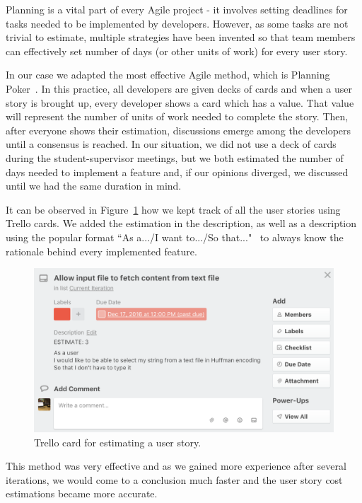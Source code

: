 \documentclass{l4proj}
\begin{document}
Planning is a vital part of every Agile project - it involves setting deadlines for tasks needed to be implemented by
developers. However, as some tasks are not trivial to estimate, multiple strategies have been invented so that team
members can effectively set number of days (or other units of work) for every user story.

In our case we adapted the most effective Agile method, which is
Planning Poker~\cite{planning-poker}. In this practice, all developers are given decks of cards and when a user story is brought up, every developer shows a card which has a value. That value will represent the number of units of work
needed to complete the story. Then, after everyone shows their estimation, discussions emerge among the developers until a consensus is reached. In our situation, we did not use a deck of cards during the student-supervisor meetings, but we both estimated the number of days needed to implement a feature and, if our opinions diverged, we discussed until we had the same duration in mind.

It can be observed in Figure~\ref{fig:estimation} how we kept track of all the user stories using Trello cards. We added the estimation in the
description, as well as a description using the popular format ``As a.../I want to.../So that..."~\cite{user-story-format} to always know the
rationale behind every implemented feature.

\pagebreak

\begin{figure}[!ht]
\centering
\includegraphics[scale=0.5]{estimation}
\caption{Trello card for estimating a user story.}
\label{fig:estimation}
\end{figure}

This method was very effective and as we gained more experience after several iterations, we would come to a conclusion
much faster and the user story cost estimations became more accurate.
\end{document}
